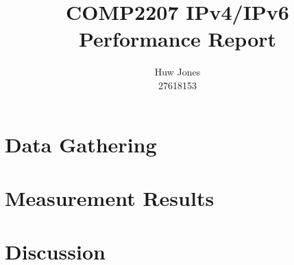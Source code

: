 \documentclass[a4paper]{article}
\author{Huw Jones \\27618153}
\title{COMP2207 IPv4/IPv6 Performance Report}
\begin{document}
\maketitle
\newpage

\section{Data Gathering}

\section{Measurement Results}

\section{Discussion}
\end{document}
